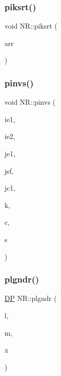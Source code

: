\mbox{\label{namespaceNR_a11f36d67ab2adaed64b8f5dbfbbf2efc}} 
\subsubsection{\texorpdfstring{piksrt()}{piksrt()}}
{\footnotesize\ttfamily void N\+R\+::piksrt (\begin{DoxyParamCaption}\item[{\mbox{\hyperlink{namespaceNR_ab293e06a6bf799d8a7ed932b6852bcb8}{Vec\+\_\+\+I\+O\+\_\+\+DP}} \&}]{arr }\end{DoxyParamCaption})}

\mbox{\label{namespaceNR_a34209b0a9d44aa222a5f76c3c7bdeeaa}} 
\subsubsection{\texorpdfstring{pinvs()}{pinvs()}}
{\footnotesize\ttfamily void N\+R\+::pinvs (\begin{DoxyParamCaption}\item[{const int}]{ie1,  }\item[{const int}]{ie2,  }\item[{const int}]{je1,  }\item[{const int}]{jsf,  }\item[{const int}]{jc1,  }\item[{const int}]{k,  }\item[{\mbox{\hyperlink{namespaceNR_a74d09ea99e0452b529d2eb055cb09108}{Mat3\+D\+\_\+\+O\+\_\+\+DP}} \&}]{c,  }\item[{\mbox{\hyperlink{namespaceNR_ad1513aa4697878ed3bff0b8b3c9dd910}{Mat\+\_\+\+I\+O\+\_\+\+DP}} \&}]{s }\end{DoxyParamCaption})}

\mbox{\label{namespaceNR_a677f4e9cdd801b4a29b667ac6915ac26}} 
\subsubsection{\texorpdfstring{plgndr()}{plgndr()}}
{\footnotesize\ttfamily \mbox{\hyperlink{namespaceNR_af6ff762dd605ff477b8e52387253a02a}{DP}} N\+R\+::plgndr (\begin{DoxyParamCaption}\item[{const int}]{l,  }\item[{const int}]{m,  }\item[{const \mbox{\hyperlink{namespaceNR_af6ff762dd605ff477b8e52387253a02a}{DP}}}]{x }\end{DoxyParamCaption})}

